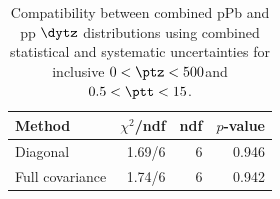 \begin{table}[htp!]
\centering
\begin{tabular}{|l|r|r|r|}
\hline
Method & $\chi^2$/ndf & ndf & $p$-value \\
\hline
Diagonal & 1.69/6 & 6 & 0.946 \\
Full covariance & 1.74/6 & 6 & 0.942 \\
\hline
\end{tabular}
\caption{Compatibility between combined pPb and pp $\dytz$ distributions using combined statistical and systematic uncertainties for inclusive $0 < \ptz < 500$\GeV and $0.5 < \ptt < 15$\GeV.}
\label{table:chisq_deta}
\end{table}
